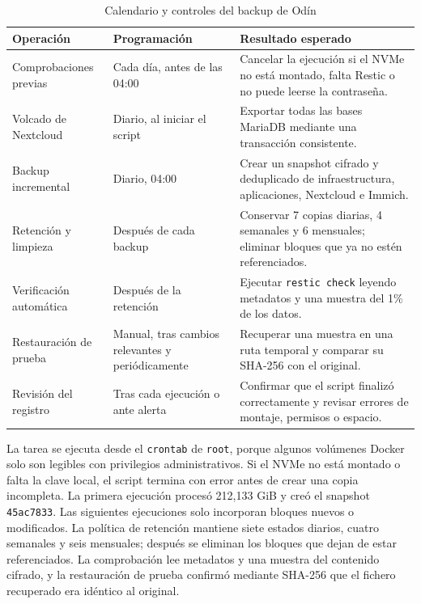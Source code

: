 \begin{table}[H]
  \centering
  \caption{Calendario y controles del backup de Odín}
  \label{tab:calendario-backup-odin}
  \small
  \begin{tabularx}{\textwidth}{
    >{\raggedright\arraybackslash}p{}
    >{\raggedright\arraybackslash}p{}
    >{\raggedright\arraybackslash}X}
    \toprule
    Operación & Programación & Resultado esperado \\
    \midrule
    Comprobaciones previas & Cada día, antes de las 04:00 & Cancelar la ejecución si el NVMe no está montado, falta Restic o no puede leerse la contraseña. \\
    Volcado de Nextcloud & Diario, al iniciar el script & Exportar todas las bases MariaDB mediante una transacción consistente. \\
    Backup incremental & Diario, 04:00 & Crear un snapshot cifrado y deduplicado de infraestructura, aplicaciones, Nextcloud e Immich. \\
    Retención y limpieza & Después de cada backup & Conservar 7 copias diarias, 4 semanales y 6 mensuales; eliminar bloques que ya no estén referenciados. \\
    Verificación automática & Después de la retención & Ejecutar \texttt{restic check} leyendo metadatos y una muestra del 1\% de los datos. \\
    Restauración de prueba & Manual, tras cambios relevantes y periódicamente & Recuperar una muestra en una ruta temporal y comparar su SHA-256 con el original. \\
    Revisión del registro & Tras cada ejecución o ante alerta & Confirmar que el script finalizó correctamente y revisar errores de montaje, permisos o espacio. \\
    \bottomrule
  \end{tabularx}
\end{table}

La tarea se ejecuta desde el \texttt{crontab} de \texttt{root}, porque algunos volúmenes Docker solo son legibles con privilegios administrativos. Si el NVMe no está montado o falta la clave local, el script termina con error antes de crear una copia incompleta. La primera ejecución procesó 212,133 GiB y creó el snapshot \texttt{45ac7833}. Las siguientes ejecuciones solo incorporan bloques nuevos o modificados. La política de retención mantiene siete estados diarios, cuatro semanales y seis mensuales; después se eliminan los bloques que dejan de estar referenciados. La comprobación lee metadatos y una muestra del contenido cifrado, y la restauración de prueba confirmó mediante SHA-256 que el fichero recuperado era idéntico al original.

